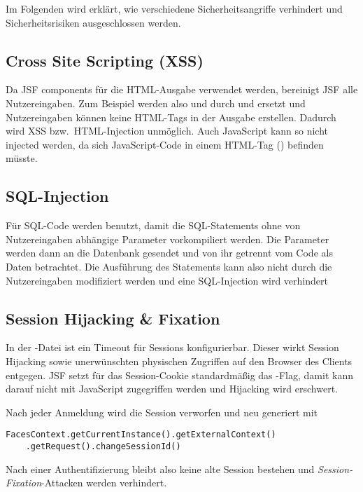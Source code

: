 
Im Folgenden wird erklärt, wie verschiedene Sicherheitsangriffe verhindert und Sicherheitsrisiken ausgeschlossen werden.

\subsection{Cross Site Scripting (XSS)}\label{subsec:xss}
Da JSF components für die HTML-Ausgabe verwendet werden, bereinigt JSF alle Nutzereingaben.
Zum Beispiel werden also  und  durch  und  ersetzt und Nutzereingaben können keine HTML-Tags in der Ausgabe erstellen.
Dadurch wird XSS bzw.\ HTML-Injection unmöglich.
Auch JavaScript kann so nicht injected werden, da sich JavaScript-Code in einem HTML-Tag () befinden müsste.

\subsection{SQL-Injection}\label{subsec:sql-injection}
Für SQL-Code werden  benutzt, damit die SQL-Statements ohne von Nutzereingaben abhängige Parameter vorkompiliert werden.
Die Parameter werden dann an die Datenbank gesendet und von ihr getrennt vom Code als Daten betrachtet.
Die Ausführung des Statements kann also nicht durch die Nutzereingaben modifiziert werden und eine SQL-Injection wird verhindert

\subsection{Session Hijacking \& Fixation}\label{subsec:session-hijacking}
In der -Datei ist ein Timeout für Sessions konfigurierbar.
Dieser wirkt Session Hijacking sowie unerwünschten physischen Zugriffen auf den Browser des Clients entgegen.
JSF setzt für das Session-Cookie standardmäßig das -Flag, damit kann darauf nicht mit JavaScript zugegriffen werden und Hijacking wird erschwert.

Nach jeder Anmeldung wird die Session verworfen und neu generiert mit
{\small
\begin{lstlisting}
FacesContext.getCurrentInstance().getExternalContext()
    .getRequest().changeSessionId()
\end{lstlisting}
}
Nach einer Authentifizierung bleibt also keine alte Session bestehen und \emph{Session-Fixation}-Attacken werden verhindert.

